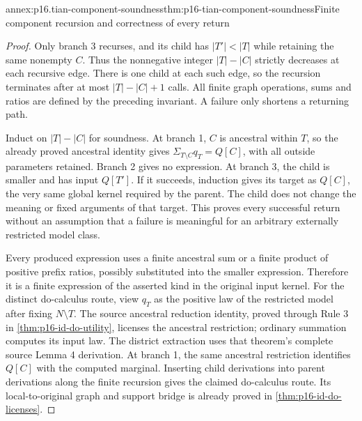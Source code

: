 \begin{annexitem}{annex:p16.tian-component-soundness}{thm:p16-tian-component-soundness}{Finite component recursion and correctness of every return}
\begin{proof}
Only branch 3 recurses, and its child has
\(|T'|<|T|\) while retaining the same nonempty \(C\).
Thus the nonnegative integer \(|T|-|C|\) strictly decreases
at each recursive edge. There is one child at each such edge,
so the recursion terminates after at most \(|T|-|C|+1\) calls.
All finite graph operations, sums and ratios are defined by the
preceding invariant. A failure only shortens a returning path.

Induct on \(|T|-|C|\) for soundness. At branch 1, \(C\) is
ancestral within \(T\), so the already proved ancestral identity
gives \(\Sigma_{T\setminus C}q_T=Q[C]\), with all outside
parameters retained. Branch 2 gives no expression. At branch 3,
the child is smaller and has input \(Q[T']\). If it succeeds,
induction gives its target as \(Q[C]\), the very same global
kernel required by the parent. The child does not change the
meaning or fixed arguments of that target. This proves every
successful return without an assumption that a failure is meaningful
for an arbitrary externally restricted model class.

Every produced expression uses a finite ancestral sum or a finite
product of positive prefix ratios, possibly substituted into the
smaller expression. Therefore it is a finite expression of the
asserted kind in the original input kernel. For the distinct
do-calculus route, view \(q_T\) as the positive law of the
restricted model after fixing \(N\setminus T\). The source
ancestral reduction identity, proved through Rule 3 in
\cref{thm:p16-id-do-utility}, licenses the ancestral restriction;
ordinary summation computes its input law. The district extraction
uses that theorem's complete source Lemma 4 derivation. At branch 1,
the same ancestral restriction identifies \(Q[C]\) with the
computed marginal. Inserting child derivations into parent derivations
along the finite recursion gives the claimed do-calculus route.
Its local-to-original graph and support bridge is already proved
in \cref{thm:p16-id-do-licenses}.
\end{proof}
\end{annexitem}

